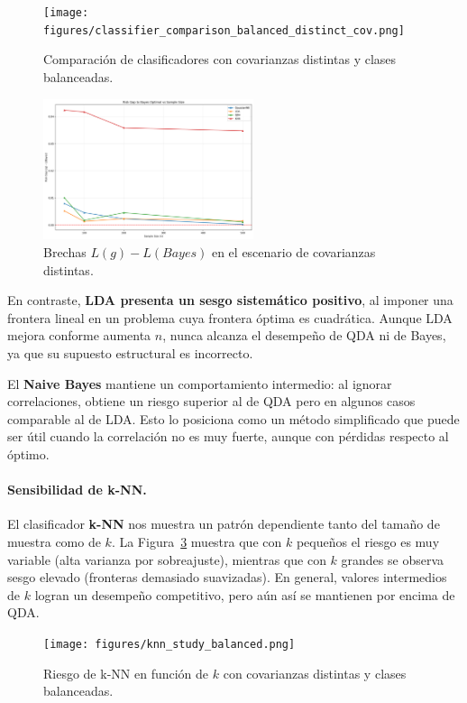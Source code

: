 \documentclass[10pt]{article}
\begin{document}
\begin{figure}[H]
    \centering
    \texttt{[image: figures/classifier\_comparison\_balanced\_distinct\_cov.png]}
    \caption{Comparación de clasificadores con covarianzas distintas y clases balanceadas.}
    \label{fig:risk_diffcov}
\end{figure}

\begin{figure}[H]
    \centering
    \includegraphics[width=0.55\textwidth]{figures/risk_gaps.png}
    \caption{Brechas $L(g)-L(Bayes)$ en el escenario de covarianzas distintas.}
    \label{fig:riskgap_diffcov}
\end{figure}

En contraste, \textbf{LDA presenta un sesgo sistemático positivo}, al imponer una frontera lineal en un problema cuya frontera óptima es cuadrática. 
Aunque LDA mejora conforme aumenta $n$, nunca alcanza el desempeño de QDA ni de Bayes, ya que su supuesto estructural es incorrecto.

El \textbf{Naive Bayes} mantiene un comportamiento intermedio: al ignorar correlaciones, obtiene un riesgo superior al de QDA pero en algunos casos comparable al de LDA. 
Esto lo posiciona como un método simplificado que puede ser útil cuando la correlación no es muy fuerte, aunque con pérdidas respecto al óptimo.

\paragraph{Sensibilidad de k-NN.}
El clasificador \textbf{k-NN} nos muestra un patrón dependiente tanto del tamaño de muestra como de $k$. 
La Figura~\ref{fig:knn_diffcov} muestra que con $k$ pequeños el riesgo es muy variable (alta varianza por sobreajuste), mientras que con $k$ grandes se observa sesgo elevado (fronteras demasiado suavizadas). 
En general, valores intermedios de $k$ logran un desempeño competitivo, pero aún así se mantienen por encima de QDA.

\begin{figure}[H]
    \centering
    \texttt{[image: figures/knn\_study\_balanced.png]}
    \caption{Riesgo de k-NN en función de $k$ con covarianzas distintas y clases balanceadas.}
    \label{fig:knn_diffcov}
\end{figure}
\end{document}
